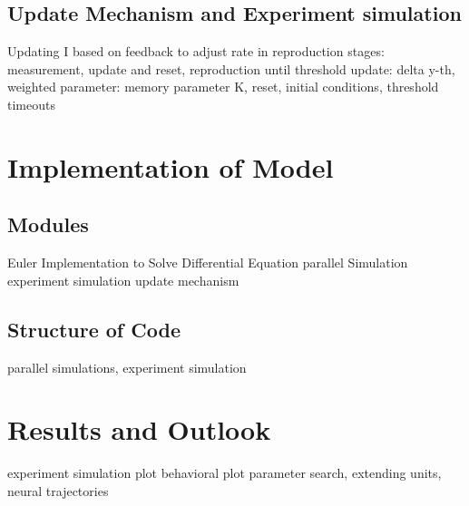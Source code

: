 \documentclass[9pt]{article}
\begin{document}
\subsection{Update Mechanism and Experiment simulation}
Updating I based on feedback to adjust rate in reproduction
stages: measurement, update and reset, reproduction until threshold 
update: delta y-th, weighted
parameter: memory parameter K, reset, initial conditions, 
threshold 
timeouts
\section{Implementation of Model}
\subsection{Modules}
Euler Implementation to Solve Differential Equation
parallel Simulation
experiment simulation
update mechanism 
\subsection{Structure of Code}
parallel simulations, experiment simulation
\section{Results and Outlook}
experiment simulation plot
behavioral plot
parameter search, extending units, neural trajectories
\end{document}

